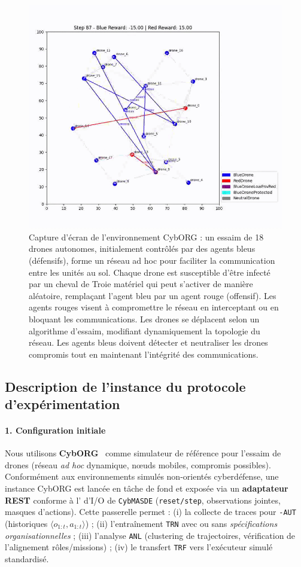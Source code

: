 \begin{figure}[h!]
  \centering
  \includegraphics[trim=0cm 1cm 0cm 1cm, clip, width=0.6\linewidth]{figures/cyborg.png}
  \caption{Capture d'écran de l'environnement CybORG : un essaim de 18 drones autonomes, initialement contrôlés par des agents bleus (défensifs), forme un réseau ad hoc pour faciliter la communication entre les unités au sol. Chaque drone est susceptible d'être infecté par un cheval de Troie matériel qui peut s'activer de manière aléatoire, remplaçant l'agent bleu par un agent rouge (offensif). Les agents rouges visent à compromettre le réseau en interceptant ou en bloquant les communications. Les drones se déplacent selon un algorithme d'essaim, modifiant dynamiquement la topologie du réseau. Les agents bleus doivent détecter et neutraliser les drones compromis tout en maintenant l'intégrité des communications.}
  \label{fig:cyborg}
\end{figure}

\subsection{Description de l'instance du protocole d'expérimentation}

\paragraph{1. Configuration initiale}

Nous utilisons \textbf{CybORG}~\cite{Standen2021} comme simulateur de référence pour l'essaim de drones (réseau \textit{ad hoc} dynamique, nœuds mobiles, compromis possibles). Conformément aux environnements simulés non-orientés cyberdéfense, une instance CybORG est lancée en tâche de fond et exposée via un \textbf{adaptateur REST} conforme à l’ d’I/O de \texttt{CybMASDE} (\texttt{reset/step}, observations jointes, masques d’actions). Cette passerelle permet : (i) la collecte de traces pour \texttt{-AUT} (historiques $\langle o_{1:t}, a_{1:t} \rangle$) ; (ii) l’entraînement  \texttt{TRN} avec ou sans \textit{spécifications organisationnelles} ; (iii) l’analyse \texttt{ANL} (clustering de trajectoires, vérification de l’alignement rôles/missions) ; (iv) le transfert \texttt{TRF} vers l’exécuteur simulé standardisé.


